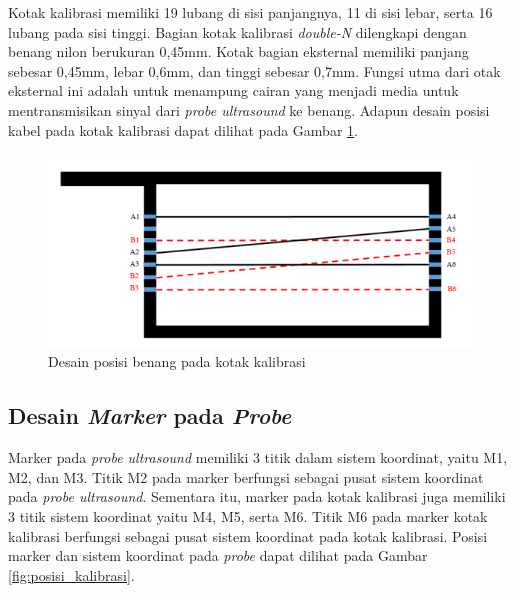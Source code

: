 Kotak kalibrasi memiliki 19 lubang di sisi panjangnya, 11 di sisi lebar, serta 16 lubang pada sisi tinggi. Bagian kotak kalibrasi \textit{double-N} dilengkapi dengan benang nilon berukuran 0,45mm. Kotak bagian eksternal memiliki panjang sebesar 0,45mm, lebar 0,6mm, dan tinggi sebesar 0,7mm. Fungsi utma dari otak eksternal ini adalah untuk menampung cairan yang menjadi media untuk mentransmisikan sinyal dari \textit{probe ultrasound} ke benang. Adapun desain posisi kabel pada kotak kalibrasi dapat dilihat pada Gambar \ref{fig:desain_posisi_kabel}. 

\begin{figure}[htbp]
	\centering
	\includegraphics[scale= 0.7]{bab2/desain_posisi_kabel.png}
	\caption{Desain posisi benang pada kotak kalibrasi}
	\label{fig:desain_posisi_kabel}
\end{figure}



\subsection{Desain \textit{Marker} pada \textit{Probe}}
Marker pada \textit{probe ultrasound} memiliki 3 titik dalam sistem koordinat, yaitu M1, M2, dan M3. Titik M2 pada marker berfungsi sebagai pusat sistem koordinat pada \textit{probe ultrasound}. Sementara itu, marker pada kotak kalibrasi juga memiliki 3 titik sistem koordinat yaitu M4, M5, serta M6. Titik M6 pada marker kotak kalibrasi berfungsi sebagai pusat sistem koordinat pada kotak kalibrasi. Posisi marker dan sistem koordinat pada \textit{probe} dapat dilihat pada Gambar \ref{fig:posisi_kalibrasi}.

